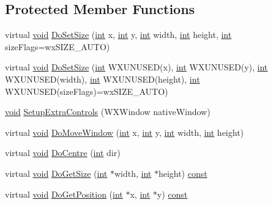\subsection*{Protected Member Functions}
\begin{DoxyCompactItemize}
\item 
virtual \hyperlink{sound_8c_ae35f5844602719cf66324f4de2a658b3}{void} \hyperlink{class_file_dialog_a6d9589eb04df8a0d011fa28f6900e372}{Do\+Set\+Size} (\hyperlink{xmltok_8h_a5a0d4a5641ce434f1d23533f2b2e6653}{int} x, \hyperlink{xmltok_8h_a5a0d4a5641ce434f1d23533f2b2e6653}{int} y, \hyperlink{xmltok_8h_a5a0d4a5641ce434f1d23533f2b2e6653}{int} width, \hyperlink{xmltok_8h_a5a0d4a5641ce434f1d23533f2b2e6653}{int} height, \hyperlink{xmltok_8h_a5a0d4a5641ce434f1d23533f2b2e6653}{int} size\+Flags=wx\+S\+I\+Z\+E\+\_\+\+A\+U\+TO)
\item 
virtual \hyperlink{sound_8c_ae35f5844602719cf66324f4de2a658b3}{void} \hyperlink{class_file_dialog_af59e1e17fd3da7162145ea4a1dd99883}{Do\+Set\+Size} (\hyperlink{xmltok_8h_a5a0d4a5641ce434f1d23533f2b2e6653}{int} W\+X\+U\+N\+U\+S\+ED(x), \hyperlink{xmltok_8h_a5a0d4a5641ce434f1d23533f2b2e6653}{int} W\+X\+U\+N\+U\+S\+ED(y), \hyperlink{xmltok_8h_a5a0d4a5641ce434f1d23533f2b2e6653}{int} W\+X\+U\+N\+U\+S\+ED(width), \hyperlink{xmltok_8h_a5a0d4a5641ce434f1d23533f2b2e6653}{int} W\+X\+U\+N\+U\+S\+ED(height), \hyperlink{xmltok_8h_a5a0d4a5641ce434f1d23533f2b2e6653}{int} W\+X\+U\+N\+U\+S\+ED(size\+Flags)=wx\+S\+I\+Z\+E\+\_\+\+A\+U\+TO)
\item 
\hyperlink{sound_8c_ae35f5844602719cf66324f4de2a658b3}{void} \hyperlink{class_file_dialog_a2643f3b1efd016313f5ca22a79cbb445}{Setup\+Extra\+Controls} (W\+X\+Window native\+Window)
\item 
virtual \hyperlink{sound_8c_ae35f5844602719cf66324f4de2a658b3}{void} \hyperlink{class_file_dialog_afda2abd60d121c5a5f09e7d1f3324b79}{Do\+Move\+Window} (\hyperlink{xmltok_8h_a5a0d4a5641ce434f1d23533f2b2e6653}{int} x, \hyperlink{xmltok_8h_a5a0d4a5641ce434f1d23533f2b2e6653}{int} y, \hyperlink{xmltok_8h_a5a0d4a5641ce434f1d23533f2b2e6653}{int} width, \hyperlink{xmltok_8h_a5a0d4a5641ce434f1d23533f2b2e6653}{int} height)
\item 
virtual \hyperlink{sound_8c_ae35f5844602719cf66324f4de2a658b3}{void} \hyperlink{class_file_dialog_a0ed2c74b76eba1831c7ba908cd01711a}{Do\+Centre} (\hyperlink{xmltok_8h_a5a0d4a5641ce434f1d23533f2b2e6653}{int} dir)
\item 
virtual \hyperlink{sound_8c_ae35f5844602719cf66324f4de2a658b3}{void} \hyperlink{class_file_dialog_afa423b7d7ab0785c028455c51a495bad}{Do\+Get\+Size} (\hyperlink{xmltok_8h_a5a0d4a5641ce434f1d23533f2b2e6653}{int} $\ast$width, \hyperlink{xmltok_8h_a5a0d4a5641ce434f1d23533f2b2e6653}{int} $\ast$height) \hyperlink{getopt1_8c_a2c212835823e3c54a8ab6d95c652660e}{const} 
\item 
virtual \hyperlink{sound_8c_ae35f5844602719cf66324f4de2a658b3}{void} \hyperlink{class_file_dialog_a1f9c220d421063f6cdafc9171210b0ca}{Do\+Get\+Position} (\hyperlink{xmltok_8h_a5a0d4a5641ce434f1d23533f2b2e6653}{int} $\ast$x, \hyperlink{xmltok_8h_a5a0d4a5641ce434f1d23533f2b2e6653}{int} $\ast$y) \hyperlink{getopt1_8c_a2c212835823e3c54a8ab6d95c652660e}{const} 
\end{DoxyCompactItemize}
